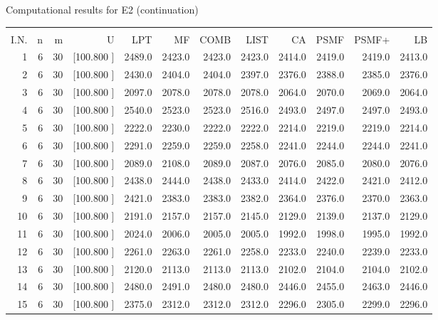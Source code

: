 \documentclass[12pt,a4paper]{article}
\begin{document}
\begin{center}
 Computational results for E2 (continuation) {\tiny
\begin{tabular}{r r r r r r r r r r r r}\hline
    &   &   &          &        &        &        &        &        &        &        &       \\[-0.1in]
  I.N.  &  n  &  m  &  U  &  LPT  &  MF  &  COMB  &  LIST  &  CA  & PSMF &PSMF+ & LB \\[0.03in]
\hline
   1&  6& 30&[100.800   ]&  2489.0&  2423.0&  2423.0&  2423.0&  2414.0&  2419.0&  2419.0&  2413.0\\[-0.02in]
   2&  6& 30&[100.800   ]&  2430.0&  2404.0&  2404.0&  2397.0&  2376.0&  2388.0&  2385.0&  2376.0\\[-0.02in]
   3&  6& 30&[100.800   ]&  2097.0&  2078.0&  2078.0&  2078.0&  2064.0&  2070.0&  2069.0&  2064.0\\[-0.02in]
   4&  6& 30&[100.800   ]&  2540.0&  2523.0&  2523.0&  2516.0&  2493.0&  2497.0&  2497.0&  2493.0\\[-0.02in]
   5&  6& 30&[100.800   ]&  2222.0&  2230.0&  2222.0&  2222.0&  2214.0&  2219.0&  2219.0&  2214.0\\[-0.02in]
   6&  6& 30&[100.800   ]&  2291.0&  2259.0&  2259.0&  2258.0&  2241.0&  2244.0&  2244.0&  2241.0\\[-0.02in]
   7&  6& 30&[100.800   ]&  2089.0&  2108.0&  2089.0&  2087.0&  2076.0&  2085.0&  2080.0&  2076.0\\[-0.02in]
   8&  6& 30&[100.800   ]&  2438.0&  2444.0&  2438.0&  2433.0&  2414.0&  2422.0&  2421.0&  2412.0\\[-0.02in]
   9&  6& 30&[100.800   ]&  2421.0&  2383.0&  2383.0&  2382.0&  2364.0&  2376.0&  2370.0&  2363.0\\[-0.02in]
  10&  6& 30&[100.800   ]&  2191.0&  2157.0&  2157.0&  2145.0&  2129.0&  2139.0&  2137.0&  2129.0\\[-0.02in]
  11&  6& 30&[100.800   ]&  2024.0&  2006.0&  2005.0&  2005.0&  1992.0&  1998.0&  1995.0&  1992.0\\[-0.02in]
  12&  6& 30&[100.800   ]&  2261.0&  2263.0&  2261.0&  2258.0&  2233.0&  2240.0&  2239.0&  2233.0\\[-0.02in]
  13&  6& 30&[100.800   ]&  2120.0&  2113.0&  2113.0&  2113.0&  2102.0&  2104.0&  2104.0&  2102.0\\[-0.02in]
  14&  6& 30&[100.800   ]&  2480.0&  2491.0&  2480.0&  2480.0&  2446.0&  2455.0&  2463.0&  2446.0\\[-0.02in]
  15&  6& 30&[100.800   ]&  2375.0&  2312.0&  2312.0&  2312.0&  2296.0&  2305.0&  2299.0&  2296.0\\[-0.02in]

\end{tabular}}
\end{center}
\end{document}
